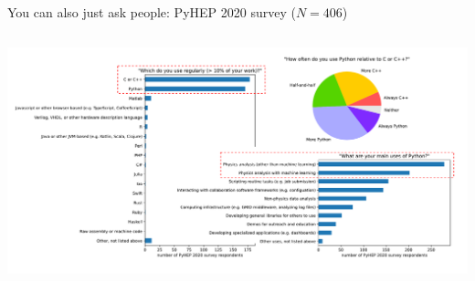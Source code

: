 \documentclass[aspectratio=169]{beamer}
\begin{document}
\begin{frame}{You can also just ask people: PyHEP 2020 survey ($N=406$)}
\vspace{0.5 cm}
\begin{columns}
\includegraphics[width=\linewidth]{PLOTS/pyhep2020-survey-5.pdf}
\end{columns}
\end{frame}
\end{document}
